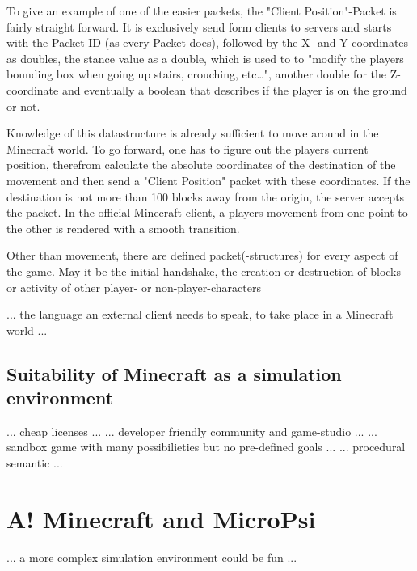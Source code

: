 To give an example of one of the easier packets, the "Client Position"-Packet is fairly straight forward. It is exclusively send form clients to servers and starts with the Packet ID (as every Packet does), followed by the X- and Y-coordinates as doubles, the stance value as a double, which is used to to "modify the players bounding box when going up stairs, crouching, etc…", another double for the Z-coordinate and eventually a boolean that describes if the player is on the ground or not.~\cite{protocol}

Knowledge of this datastructure is already sufficient to move around in the Minecraft world. To go forward, one has to figure out the players current position, therefrom calculate the absolute coordinates of the destination of the movement and then send a "Client Position" packet with these coordinates. If the destination is not more than 100 blocks away from the origin, the server accepts the packet. In the official Minecraft client, a players movement from one point to the other is rendered with a smooth transition.

Other than movement, there are defined packet(-structures) for every aspect of the game. May it be the initial handshake, the creation or destruction of blocks or activity of other player- or non-player-characters

... the language an external client needs to speak, to take place in a Minecraft world ...

        \subsection{Suitability of Minecraft as a simulation environment}
... cheap licenses ...
... developer friendly community and game-studio ...
... sandbox game with many possibilieties but no pre-defined goals ...
... procedural semantic ...

    \section{A! Minecraft and MicroPsi}
... a more complex simulation environment could be fun ...